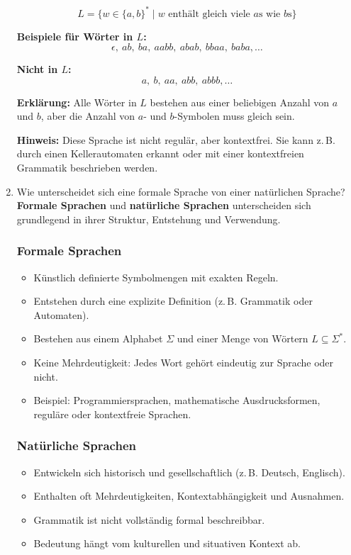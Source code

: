 \documentclass[a4paper,12pt]{article}
\begin{document}
\begin{enumerate}
			\[
			L = \{ w \in \{a, b\}^* \mid w \text{ enthält gleich viele } a\text{s wie } b\text{s} \}
			\]
			
			\textbf{Beispiele für Wörter in \( L \):}
			\[
			\epsilon,\ ab,\ ba,\ aabb,\ abab,\ bbaa,\ baba,\ldots
			\]
			
			\textbf{Nicht in \( L \):}
			\[
			a,\ b,\ aa,\ abb,\ abbb,\ldots
			\]
			
			\textbf{Erklärung:}  
			Alle Wörter in \( L \) bestehen aus einer beliebigen Anzahl von \( a \) und \( b \), aber die Anzahl von \( a \)- und \( b \)-Symbolen muss gleich sein.
			
			\textbf{Hinweis:}  
			Diese Sprache ist nicht regulär, aber kontextfrei. Sie kann z.\,B. durch einen Kellerautomaten erkannt oder mit einer kontextfreien Grammatik beschrieben werden.
			\item Wie unterscheidet sich eine formale Sprache von einer natürlichen Sprache?\\
			
			\textbf{Formale Sprachen} und \textbf{natürliche Sprachen} unterscheiden sich grundlegend in ihrer Struktur, Entstehung und Verwendung.
			
			\subsubsection*{Formale Sprachen}
			
			\begin{itemize}
				\item Künstlich definierte Symbolmengen mit exakten Regeln.
				\item Entstehen durch eine explizite Definition (z.\,B. Grammatik oder Automaten).
				\item Bestehen aus einem Alphabet \( \Sigma \) und einer Menge von Wörtern \( L \subseteq \Sigma^* \).
				\item Keine Mehrdeutigkeit: Jedes Wort gehört eindeutig zur Sprache oder nicht.
				\item Beispiel: Programmiersprachen, mathematische Ausdrucksformen, reguläre oder kontextfreie Sprachen.
			\end{itemize}
			
			\subsubsection*{Natürliche Sprachen}
			
			\begin{itemize}
				\item Entwickeln sich historisch und gesellschaftlich (z.\,B. Deutsch, Englisch).
				\item Enthalten oft Mehrdeutigkeiten, Kontextabhängigkeit und Ausnahmen.
				\item Grammatik ist nicht vollständig formal beschreibbar.
				\item Bedeutung hängt vom kulturellen und situativen Kontext ab.
			\end{itemize}
			

\end{enumerate}
\end{document}
